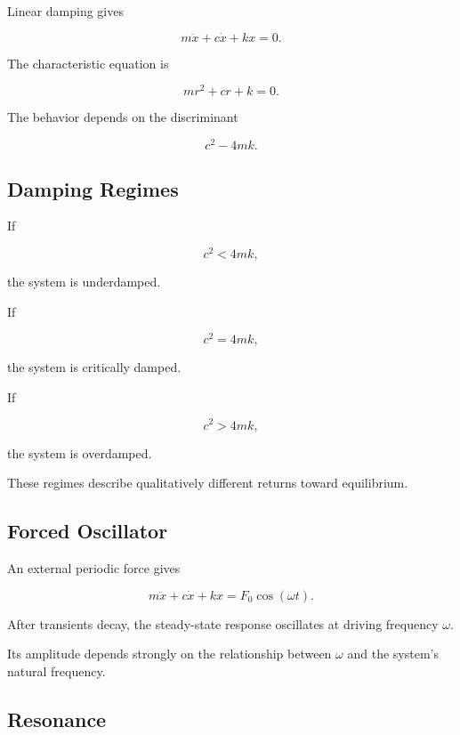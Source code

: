 Linear damping gives

\[
\boxed{
m\ddot{x}
+
c\dot{x}
+
kx
=
0.
}
\]

The characteristic equation is

\[
\boxed{
mr^2+cr+k=0.
}
\]

The behavior depends on the discriminant

\[
c^2-4mk.
\]

\subsection{Damping Regimes}
\label{subsec:damping-regimes}

If

\[
\boxed{
c^2<4mk,
}
\]

the system is underdamped.

If

\[
\boxed{
c^2=4mk,
}
\]

the system is critically damped.

If

\[
\boxed{
c^2>4mk,
}
\]

the system is overdamped.

These regimes describe qualitatively different returns toward equilibrium.

\subsection{Forced Oscillator}
\label{subsec:forced-oscillator}

An external periodic force gives

\[
\boxed{
m\ddot{x}
+
c\dot{x}
+
kx
=
F_0\cos(\omega t).
}
\]

After transients decay, the steady-state response oscillates at driving
frequency \(\omega\).

Its amplitude depends strongly on the relationship between \(\omega\) and
the system's natural frequency.

\subsection{Resonance}
\label{subsec:physical-resonance}

